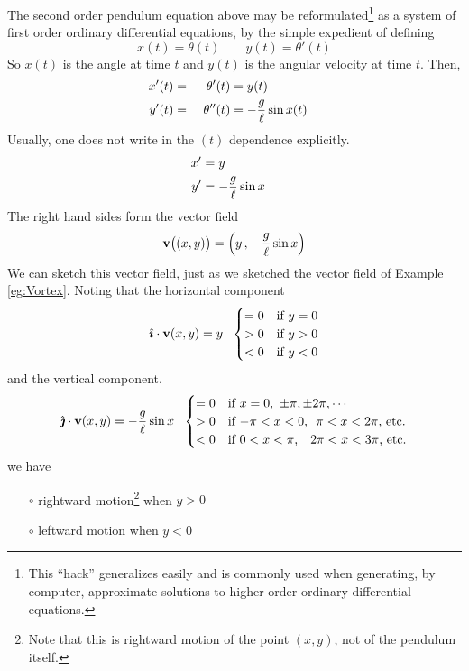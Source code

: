 \begin{eg}
The second order pendulum equation above may be 
reformulated\footnote{This ``hack'' generalizes easily and is 
commonly used when generating, by computer, approximate solutions to higher order ordinary differential equations.} 
as a system of first order ordinary differential equations, by the 
simple expedient of defining
\begin{equation*}
x(t)=\theta(t)\qquad y(t)=\theta'(t)
\end{equation*}
So $x(t)$ is the angle at time $t$ and $y(t)$ is the angular velocity at time $t$. Then, 
\begin{alignat*}{3}
x'(t)&=&\theta'(t)&=y(t)\cr
y'(t)&=&\ \theta''(t)&=-\frac{g}{\ell}\sin x(t)
\end{alignat*}
Usually, one does not write in the $(t)$ dependence explicitly.
\begin{align*}
x'&=y\cr
y'&=-\frac{g}{\ell}\sin x
\end{align*}
The right hand sides form the vector field
\begin{equation*}
\mathbf{v}\big((x,y)\big)=\Big(y\,,\,-\frac{g}{\ell}\sin x\Big)
\end{equation*}
We can sketch this vector field, just as we sketched the vector field 
of Example \ref{eg:Vortex}. Noting that the horizontal component
\begin{equation*}
\hi\cdot\vv(x,y)
= y\ \ 
\begin{cases}
   =0 &\text{if $y=0$}\\
   >0 &\text{if $y>0$}\\
   <0 &\text{if $y<0$}
\end{cases}
\end{equation*}
and the vertical component.
\begin{equation*}
\hj\cdot\vv(x,y)
= -\frac{g}{\ell}\sin x\ \ 
\begin{cases}
   =0 &\text{if $x=0,\ \pm\pi, \pm2\pi, \cdots$}\\
   >0 &\text{if $-\pi<x<0$,\ \  $\pi<x<2\pi$, etc.}\\
   <0 &\text{if $0<x<\pi$, \ \ $2\pi<x<3\pi$, etc.}
\end{cases}
\end{equation*}
we have
\begin{itemize}\itemsep1pt \parskip0pt  %
\item[$\circ$]
rightward motion\footnote{Note that this is rightward motion of the point $(x,y)$, not of the pendulum itself.} when $y>0$
\item[$\circ$]
leftward motion when $y<0$

\end{itemize}
\end{eg}
